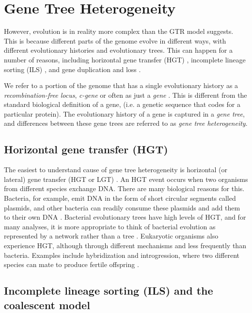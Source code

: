 \documentclass[tocnosub,noragright,centerchapter,fullpagesingle,12pt]{uiuc_csthesis18}
\begin{document}
\section{Gene Tree Heterogeneity}
\label{sec:heterogeneity}

However, evolution is in reality more complex than the GTR model
suggests. This is because different parts of the genome evolve in
different ways, with different evolutionary histories and evolutionary
trees. This can happen for a number of reasons, including
horizontal gene transfer (HGT) \cite{steel2013identifying,roch2013recovering}, incomplete lineage sorting (ILS) \cite{maddison1997gene,mirarab2014evaluating}, and gene duplication and loss \cite{maddison1997gene}.

We refer to a portion of the genome that has a single evolutionary
history as a \emph{recombination-free locus}, \emph{c-gene} or often as just a \emph{gene} \cite{SpringerGatesy2016}. This is
different from the standard biological definition of a gene, (i.e. a
genetic sequence that codes for a particular protein). The
evolutionary history of a gene is captured in a \emph{gene tree}, and
differences between these gene trees are referred to as \emph{gene
  tree heterogeneity}. 

\subsection{Horizontal gene transfer (HGT)}

The easiest to understand cause of gene tree heterogeneity is
horizontal (or lateral) gene transfer (HGT or LGT) \cite{jain1999horizontal}. An HGT event
occurs when two organisms from different species exchange DNA. There
are many biological reasons for this. Bacteria, for example, emit DNA
in the form of short circular segments called plasmids, and other
bacteria can readily consume these plasmids and add them to their own
DNA \cite{thomas2005mechanisms}. Bacterial evolutionary trees have high levels of HGT, and for
many analyses, it is more appropriate to think of bacterial evolution
as represented by a network rather than a tree \cite{huson2005application}. Eukaryotic organisms
also experience HGT, although through different mechanisms and less frequently than bacteria. Examples include hybridization and introgression, where two different species can mate
to produce fertile offspring \cite{anderson1953introgressive, yu2013fast}. 


\subsection{Incomplete lineage sorting (ILS) and the coalescent model}
\end{document}
